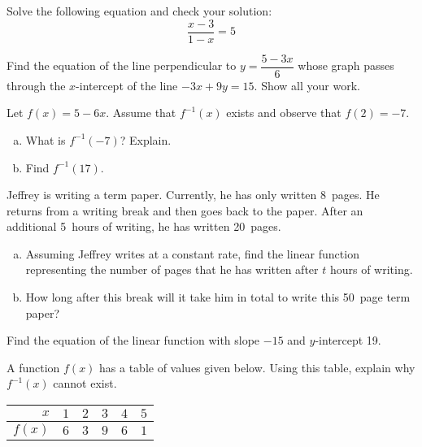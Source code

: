 \documentclass[11pt,letterpaper]{article}
\begin{document}
\prob Solve the following equation and check your solution:
	\[
	\dfrac{x - 3}{1 - x}= 5
	\] \pspace


\prob Find the equation of the line perpendicular to $y= \dfrac{5 - 3x}{6}$ whose graph passes through the $x$-intercept of the line $-3x + 9y= 15$. Show all your work. \pspace


\prob Let $f(x)= 5 - 6x$. Assume that $f^{-1}(x)$ exists and observe that $f(2)= -7$.
	\begin{enumerate}[(a)]
	\item What is $f^{-1}(-7)$? Explain. 
	\item Find $f^{-1}(17)$.
	\end{enumerate} \pspace


\prob Jeffrey is writing a term paper. Currently, he has only written 8~pages. He returns from a writing break and then goes back to the paper. After an additional 5~hours of writing, he has written 20~pages. 
	\begin{enumerate}[(a)]
	\item Assuming Jeffrey writes at a constant rate, find the linear function representing the number of pages that he has written after $t$ hours of writing. 
	\item How long after this break will it take him in total to write this 50~page term paper?
	\end{enumerate}  \pspace


\prob Find the equation of the linear function with slope $-15$ and $y$-intercept 19. \pspace


\prob A function $f(x)$ has a table of values given below. Using this table, explain why $f^{-1}(x)$ cannot exist. \par
	\begin{table}[H]
	\centering
	\begin{tabular}{|r||c|c|c|c|c|} \hline
	$x$ & $1$ & $2$ & $3$ & $4$ & $5$ \\ \hline
	$f(x)$ & $6$ & $3$ & $9$ & $6$ & $1$ \\ \hline
	\end{tabular}
	\end{table} \pspace
\end{document}
